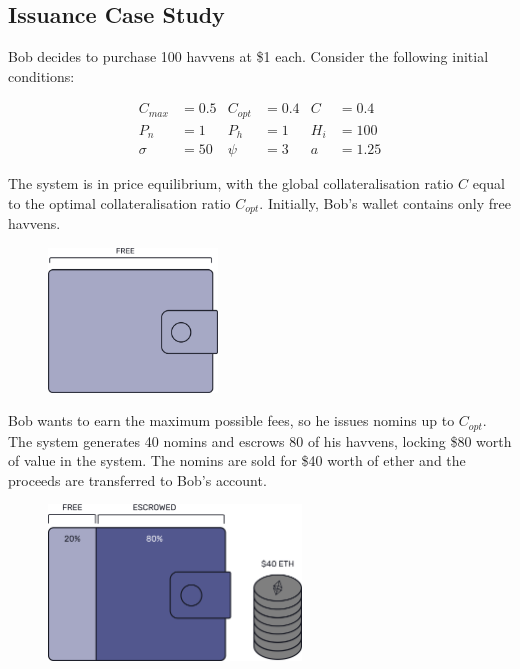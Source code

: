 \newpage

\subsection{Issuance Case Study} 

\noindent Bob decides to purchase 100 havvens at \$1 each. Consider the
following initial conditions:

\begin{align*}
C_{max} &= 0.5 & C_{opt} &= 0.4 & C &= 0.4 \\
P_n &= 1 & P_h &= 1 & H_i &= 100 \\
\sigma &= 50 & \psi &= 3 & a&= 1.25
\end{align*}

\noindent The system is in price equilibrium, with the global
collateralisation ratio \(C\) equal to the optimal collateralisation ratio
\(C_{opt}\). Initially, Bob's wallet contains only free havvens.

\begin{figure}[h!]
\centering
    \includegraphics[width=0.40\textwidth]{img/wallet}
\end{figure}

\noindent Bob wants to earn the maximum possible fees, so he issues nomins up
to \(C_{opt}\). The system generates 40 nomins and escrows 80 of his havvens,
locking \$80 worth of value in the system. The nomins are sold for \$40 worth
of ether and the proceeds are transferred to Bob's account.
\begin{figure}[h!] \centering
\includegraphics[width=0.6\textwidth]{img/escrowed} \end{figure}

